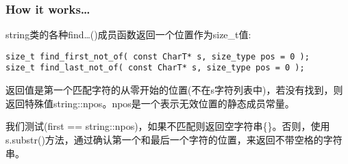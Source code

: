 \subsubsection{How it works…}

string类的各种find…()成员函数返回一个位置作为size\_t值:

\begin{lstlisting}[style=styleCXX]
size_t find_first_not_of( const CharT* s, size_type pos = 0 );
size_t find_last_not_of( const CharT* s, size_type pos = 0 );
\end{lstlisting}

返回值是第一个匹配字符的从零开始的位置(不在s字符列表中)，若没有找到，则返回特殊值string::npos。npos是一个表示无效位置的静态成员常量。

我们测试(first == string::npos)，如果不匹配则返回空字符串\{\}。否则，使用s.substr()方法，通过确认第一个和最后一个字符的位置，来返回不带空格的字符串。














